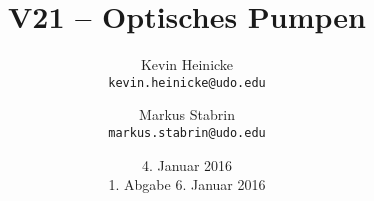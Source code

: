 


\title{%
    V21 -- Optisches Pumpen
}
\author{%
    Kevin Heinicke\\
    \texttt{kevin.heinicke@udo.edu}
    \and
    Markus Stabrin\\
    \texttt{markus.stabrin@udo.edu}
}
\date{%
    4. Januar 2016\\
    {\small 1. Abgabe} 6. Januar 2016\\
}

    \maketitle%
    \tableofcontents
    \newpage
    
    

    \printbibliography

